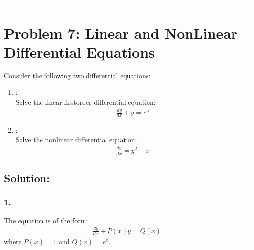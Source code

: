 \documentclass[letterpaper,10pt,english]{jupyterBook}
\begin{document}
\bigskip\hrule\bigskip



\section{Problem 7: Linear and Non\sphinxhyphen{}Linear Differential Equations}
\label{\detokenize{prerequisites:problem-7-linear-and-non-linear-differential-equations}}
\sphinxAtStartPar
Consider the following two differential equations:
\begin{enumerate}
%
\item {} 
\sphinxAtStartPar
{}:\\
Solve the linear first\sphinxhyphen{}order differential equation:
\begin{equation*}
\begin{split}
   \frac{dy}{dx} + y = e^x
   \end{split}
\end{equation*}
\item {} 
\sphinxAtStartPar
{}:\\
Solve the non\sphinxhyphen{}linear differential equation:
\begin{equation*}
\begin{split}
   \frac{dy}{dx} = y^2 - x
   \end{split}
\end{equation*}
\end{enumerate}


\subsection{Solution:}
\label{\detokenize{prerequisites:id8}}

\subsubsection{1. }
\label{\detokenize{prerequisites:linear-differential-equation}}
\sphinxAtStartPar
The equation is of the form:
\begin{equation*}
\begin{split}
\frac{dy}{dx} + P(x) y = Q(x)
\end{split}
\end{equation*}
\sphinxAtStartPar
where \(P(x) = 1\) and \(Q(x) = e^x\).
\end{document}
